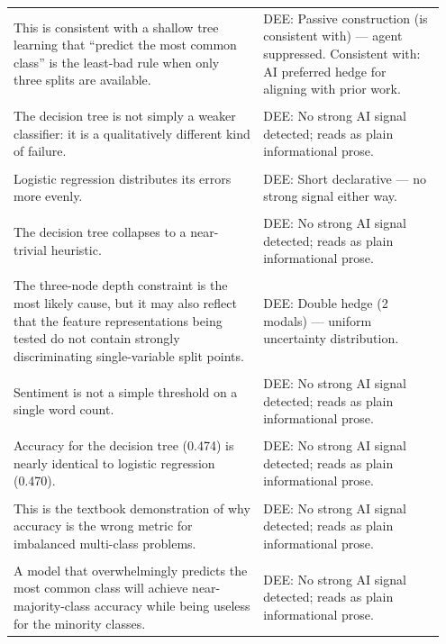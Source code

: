 \documentclass[11pt]{article}
\begin{document}
\begin{longtable}{|p{0.55\linewidth}|p{0.40\linewidth}|}
\hline
\rule{0pt}{3.5cm} & \\
\hline
This is consistent with a shallow tree learning that ``predict the most common class'' is the least-bad rule when only three splits are available. & DEE: Passive construction (is consistent with) --- agent suppressed. Consistent with: AI preferred hedge for aligning with prior work. \\[2pt]
\hline
\rule{0pt}{3.5cm} & \\
\hline
The decision tree is not simply a weaker classifier: it is a qualitatively different kind of failure. & DEE: No strong AI signal detected; reads as plain informational prose. \\[2pt]
\hline
\rule{0pt}{3.5cm} & \\
\hline
Logistic regression distributes its errors more evenly. & DEE: Short declarative --- no strong signal either way. \\[2pt]
\hline
\rule{0pt}{3.5cm} & \\
\hline
The decision tree collapses to a near-trivial heuristic. & DEE: No strong AI signal detected; reads as plain informational prose. \\[2pt]
\hline
\rule{0pt}{3.5cm} & \\
\hline
The three-node depth constraint is the most likely cause, but it may also reflect that the feature representations being tested do not contain strongly discriminating single-variable split points. & DEE: Double hedge (2 modals) --- uniform uncertainty distribution. \\[2pt]
\hline
\rule{0pt}{3.5cm} & \\
\hline
Sentiment is not a simple threshold on a single word count. & DEE: No strong AI signal detected; reads as plain informational prose. \\[2pt]
\hline
\rule{0pt}{3.5cm} & \\
\hline
Accuracy for the decision tree (0.474) is nearly identical to logistic regression (0.470). & DEE: No strong AI signal detected; reads as plain informational prose. \\[2pt]
\hline
\rule{0pt}{3.5cm} & \\
\hline
This is the textbook demonstration of why accuracy is the wrong metric for imbalanced multi-class problems. & DEE: No strong AI signal detected; reads as plain informational prose. \\[2pt]
\hline
\rule{0pt}{3.5cm} & \\
\hline
A model that overwhelmingly predicts the most common class will achieve near-majority-class accuracy while being useless for the minority classes. & DEE: No strong AI signal detected; reads as plain informational prose. \\[2pt]

\end{longtable}
\end{document}
